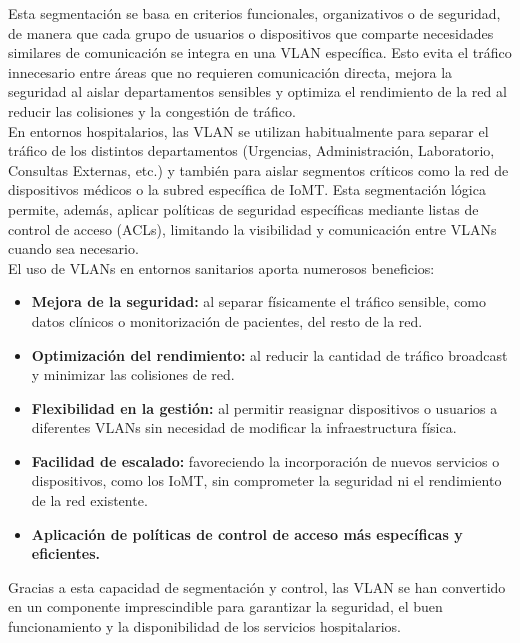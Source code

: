 Esta segmentación se basa en criterios funcionales, organizativos o de seguridad, de manera que cada grupo de usuarios o dispositivos que comparte necesidades similares de 
comunicación se integra en una VLAN específica. Esto evita el tráfico innecesario entre áreas que no requieren comunicación directa, mejora la seguridad al aislar departamentos 
sensibles y optimiza el rendimiento de la red al reducir las colisiones y la congestión de tráfico.\\

En entornos hospitalarios, las VLAN se utilizan habitualmente para separar el tráfico de los distintos departamentos (Urgencias, Administración, Laboratorio, Consultas 
Externas, etc.) y también para aislar segmentos críticos como la red de dispositivos médicos o la subred específica de IoMT. Esta segmentación lógica permite, 
además, aplicar políticas de seguridad específicas mediante listas de control de acceso (ACLs), limitando la visibilidad y comunicación entre VLANs cuando sea necesario.\\

El uso de VLANs en entornos sanitarios aporta numerosos beneficios:
\begin{itemize}
    \item \textbf{Mejora de la seguridad:} al separar físicamente el tráfico sensible, como datos clínicos o monitorización de pacientes, del resto de la red.
    \item \textbf{Optimización del rendimiento:} al reducir la cantidad de tráfico broadcast y minimizar las colisiones de red.
    \item \textbf{Flexibilidad en la gestión:} al permitir reasignar dispositivos o usuarios a diferentes VLANs sin necesidad de modificar la infraestructura física.
    \item \textbf{Facilidad de escalado:} favoreciendo la incorporación de nuevos servicios o dispositivos, como los IoMT, sin comprometer la seguridad ni el rendimiento 
    de la red existente.
    \item \textbf{Aplicación de políticas de control de acceso más específicas y eficientes.}
\end{itemize}
Gracias a esta capacidad de segmentación y control, las VLAN se han convertido en un componente imprescindible para garantizar la seguridad, el buen funcionamiento y la 
disponibilidad de los servicios hospitalarios.

